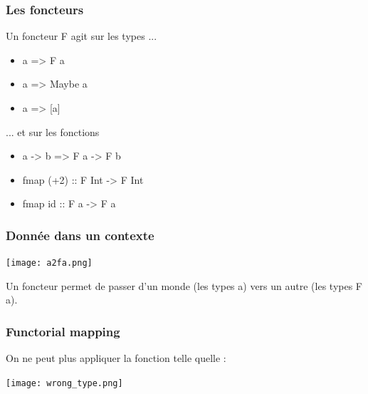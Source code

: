 \documentclass{beamer}
\begin{document}
\begin{frame}
\frametitle{Les foncteurs}
\begin{block}{Un foncteur F agit sur les types ...}
\begin{itemize}
\item a => F a
\end{itemize}
\end{block}
\begin{exampleblock}{}
\begin{itemize}
\item a => Maybe a
\item a => [a]
\end{itemize}
\end{exampleblock}

\pause

\begin{block}{... et sur les fonctions}
\begin{itemize}
\item a -> b => F a -> F b
\end{itemize}
\end{block}

\begin{exampleblock}{}
\begin{itemize}
\item fmap (+2) :: F Int -> F Int
\item fmap id :: F a -> F a
\end{itemize}
\end{exampleblock}
\end{frame}

\begin{frame}
\frametitle{Donnée dans un contexte}

\begin{center}
\texttt{[image: a2fa.png]}
\end{center}

\begin{block}{}
Un foncteur permet de passer d'un monde (les types a) vers un autre (les types F a).
\end{block}

\end{frame}

\begin{frame}
\frametitle{Functorial mapping}
On ne peut plus appliquer la fonction telle quelle :

\begin{center}
\texttt{[image: wrong\_type.png]}
\end{center}
\end{frame}
\end{document}
